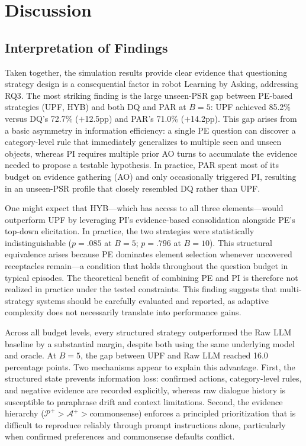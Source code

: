 \documentclass[manuscript,review,anonymous]{acmart}
\newcommand{\revstart}{\color{revcolor}}  %
\renewcommand{\revstart}{}
\begin{document}
\section{Discussion}
\label{sec:discussion}
{\revstart

\subsection{Interpretation of Findings}

Taken together, the simulation results provide clear evidence that questioning strategy design is a consequential factor in robot Learning by Asking, addressing RQ3. The most striking finding is the large unseen-PSR gap between PE-based strategies (UPF, HYB) and both DQ and PAR at $B=5$: UPF achieved 85.2\% versus DQ's 72.7\% ($+$12.5pp) and PAR's 71.0\% ($+$14.2pp). This gap arises from a basic asymmetry in information efficiency: a single PE question can discover a category-level rule that immediately generalizes to multiple seen and unseen objects, whereas PI requires multiple prior AO turns to accumulate the evidence needed to propose a testable hypothesis. In practice, PAR spent most of its budget on evidence gathering (AO) and only occasionally triggered PI, resulting in an unseen-PSR profile that closely resembled DQ rather than UPF.

One might expect that HYB---which has access to all three elements---would outperform UPF by leveraging PI's evidence-based consolidation alongside PE's top-down elicitation. In practice, the two strategies were statistically indistinguishable ($p = .085$ at $B=5$; $p = .796$ at $B=10$). This structural equivalence arises because PE dominates element selection whenever uncovered receptacles remain---a condition that holds throughout the question budget in typical episodes. The theoretical benefit of combining PE and PI is therefore not realized in practice under the tested constraints. This finding suggests that multi-strategy systems should be carefully evaluated and reported, as adaptive complexity does not necessarily translate into performance gains.

Across all budget levels, every structured strategy outperformed the Raw LLM baseline by a substantial margin, despite both using the same underlying model and oracle. At $B=5$, the gap between UPF and Raw LLM reached 16.0 percentage points. Two mechanisms appear to explain this advantage. First, the structured state prevents information loss: confirmed actions, category-level rules, and negative evidence are recorded explicitly, whereas raw dialogue history is susceptible to paraphrase drift and context limitations. Second, the evidence hierarchy ($\mathcal{P}^+ > \mathcal{A}^+ > \text{commonsense}$) enforces a principled prioritization that is difficult to reproduce reliably through prompt instructions alone, particularly when confirmed preferences and commonsense defaults conflict.

}
\end{document}
